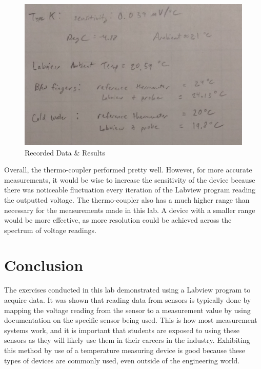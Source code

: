 \documentclass[12pt]{article}
\begin{document}
\newpage

\begin{figure}[h!] %
   \centering
   \includegraphics[width=\linewidth]{lab_notes.jpg} 
   \caption{Recorded Data \& Results}
   \label{fig:example}
\end{figure}

 
Overall, the thermo-coupler performed pretty well. However, for more accurate measurements, it would be wise to increase the sensitivity of the device because there was noticeable fluctuation every iteration of the Labview program reading the outputted voltage. The thermo-coupler also has a much higher range than necessary for the measurements made in this lab. A device with a smaller range would be more effective, as more resolution could be achieved across the spectrum of voltage readings.
\bigskip


\section*{\fontsize{12}{12}\selectfont \large Conclusion}
The exercises conducted in this lab demonstrated using a Labview program to acquire data. It was shown that reading data from sensors is typically done by mapping the voltage reading from the sensor to a measurement value by using documentation on the specific sensor being used. This is how most measurement systems work, and it is important that students are exposed to using these sensors as they will likely use them in their careers in the industry. Exhibiting this method by use of a temperature measuring device is good because these types of devices are commonly used, even outside of the engineering world. 
\end{document}
